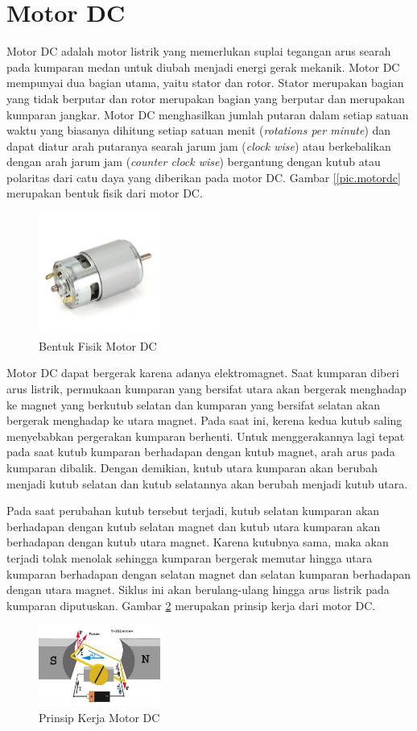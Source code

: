 \section{Motor DC}
Motor DC adalah motor listrik yang memerlukan suplai tegangan arus searah pada kumparan medan untuk diubah menjadi energi gerak mekanik. Motor DC mempunyai dua bagian utama, yaitu stator dan rotor. Stator merupakan bagian yang tidak berputar dan rotor merupakan bagian yang berputar dan merupakan kumparan jangkar. Motor DC menghasilkan jumlah putaran dalam setiap satuan waktu yang biasanya dihitung setiap satuan menit (\textit{rotations per minute}) dan dapat diatur arah putaranya searah jarum jam (\textit{clock wise}) atau berkebalikan dengan arah jarum jam (\textit{counter clock wise}) bergantung dengan kutub atau polaritas dari catu daya yang diberikan pada motor DC. Gambar \ref{[pic.motordc} merupakan bentuk fisik dari motor DC.
	\begin{figure}[H]
	\centering
	\includegraphics[width=4cm]{gambar/motorDC.jpeg}
	\caption{Bentuk Fisik Motor DC}
	\label{pic.motordc}
\end{figure}

Motor DC dapat bergerak karena adanya elektromagnet. Saat kumparan diberi arus listrik, permukaan kumparan yang bersifat utara akan bergerak menghadap ke magnet yang berkutub selatan dan kumparan yang bersifat selatan akan bergerak menghadap ke utara magnet. Pada saat ini, kerena kedua kutub saling menyebabkan pergerakan kumparan berhenti. Untuk menggerakannya lagi tepat pada saat kutub kumparan berhadapan dengan kutub magnet, arah arus pada kumparan dibalik. Dengan demikian, kutub utara kumparan akan berubah menjadi kutub selatan dan kutub selatannya akan berubah menjadi kutub utara.  

Pada saat perubahan kutub tersebut terjadi, kutub selatan kumparan akan berhadapan dengan kutub selatan magnet dan kutub utara kumparan akan berhadapan dengan kutub utara magnet. Karena kutubnya sama, maka akan terjadi tolak menolak sehingga kumparan bergerak memutar hingga utara kumparan berhadapan dengan selatan magnet dan selatan kumparan berhadapan dengan utara magnet. Siklus ini akan berulang-ulang hingga arus listrik pada kumparan diputuskan. Gambar \ref{pic.motordcprinsipkerja} merupakan prinsip kerja dari motor DC.
	\begin{figure}[H]
	\centering
	\includegraphics[width=4cm]{gambar/prinsipDC.jpg}
	\caption{Prinsip Kerja Motor DC}
	\label{pic.motordcprinsipkerja}
\end{figure}


